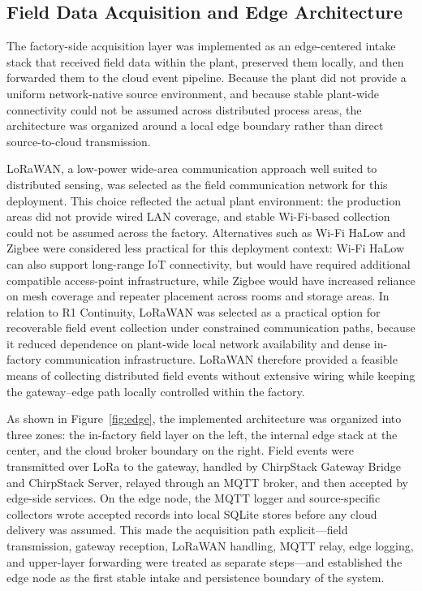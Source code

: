 \documentclass[systems,article,accept,pdftex,moreauthors]{Definitions/mdpi}
\begin{document}
\subsection{Field Data Acquisition and Edge Architecture}
\label{sec:field_acquisition_edge}


The factory-side acquisition layer was implemented as an edge-centered intake stack that received field data within the plant, preserved them locally, and then forwarded them to the cloud event pipeline. Because the plant did not provide a uniform network-native source environment, and because stable plant-wide connectivity could not be assumed across distributed process areas, the architecture was organized around a local edge boundary rather than direct source-to-cloud transmission.

LoRaWAN, a low-power wide-area communication approach well suited to distributed sensing, was selected as the field communication network for this deployment. This choice reflected the actual plant environment: the production areas did not provide wired LAN coverage, and stable Wi-Fi-based collection could not be assumed across the factory. Alternatives such as Wi-Fi HaLow and Zigbee were considered less practical for this deployment context: Wi-Fi HaLow can also support long-range IoT connectivity, but would have required additional compatible access-point infrastructure, while Zigbee would have increased reliance on mesh coverage and repeater placement across rooms and storage areas. In relation to R1 Continuity, LoRaWAN was selected as a practical option for recoverable field event collection under constrained communication paths, because it reduced dependence on plant-wide local network availability and dense in-factory communication infrastructure. LoRaWAN therefore provided a feasible means of collecting distributed field events without extensive wiring while keeping the gateway--edge path locally controlled within the factory.

As shown in Figure~\ref{fig:edge}, the implemented architecture was organized into three zones: the in-factory field layer on the left, the internal edge stack at the center, and the cloud broker boundary on the right. Field events were transmitted over LoRa to the gateway, handled by ChirpStack Gateway Bridge and ChirpStack Server, relayed through an MQTT broker, and then accepted by edge-side services. On the edge node, the MQTT logger and source-specific collectors wrote accepted records into local SQLite stores before any cloud delivery was assumed. This made the acquisition path explicit---field transmission, gateway reception, LoRaWAN handling, MQTT relay, edge logging, and upper-layer forwarding were treated as separate steps---and established the edge node as the first stable intake and persistence boundary of the system.
\end{document}
